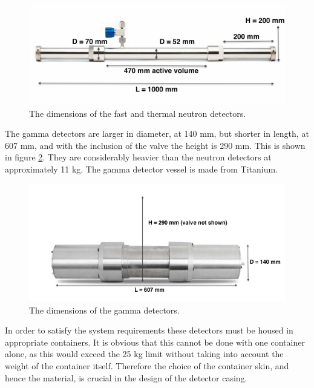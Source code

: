 \begin{figure}[htbp]
\begin{center}
\includegraphics[width=120mm]{Chapter6/figures/fastNeutronDetector.png}
\caption{The dimensions of the fast and thermal neutron detectors.}
\label{fig:fastNeutronDetectorDims}
\end{center}
\end{figure}

The gamma detectors are larger in diameter, at 140 mm, but shorter in length, at 607 mm, and with the inclusion of the valve the height is 290 mm. This is shown in figure \ref{fig:gammaDetectorDims}. They are considerably heavier than the neutron detectors at approximately 11 kg. The gamma detector vessel is made from Titanium.

\begin{figure}[htbp]
\begin{center}
\includegraphics[width=140mm]{Chapter6/figures/gammaDetector.png}
\caption{The dimensions of the gamma detectors.}
\label{fig:gammaDetectorDims}
\end{center}
\end{figure}

In order to satisfy the system requirements these detectors must be housed in appropriate containers. It is obvious that this cannot be done with one container alone, as this would exceed the 25 kg limit without taking into account the weight of the container itself. Therefore the choice of the container skin, and hence the material, is crucial in the design of the detector casing.

